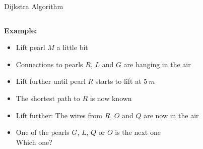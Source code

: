 
\begin{frame}{Dijkstra Algorithm}
  \vspace{-1.5em}
  \begin{columns}
    \begin{column}{0.55\linewidth}
      \textbf{Example:}
      \begin{itemize}
        \item
          Lift pearl {\color{Mittel-Blau}$M$} a little bit
        \item
          Connections to pearls {\color{Mittel-Blau}$R$},
          {\color{Mittel-Blau}$L$} and {\color{Mittel-Blau}$G$} are hanging in
          the air
        \item
          Lift further until pearl {\color{Mittel-Blau}$R$} starts to lift at
          $\SI{5}{m}$
        \item
          The shortest path to {\color{Mittel-Blau}$R$} is now known
        \item
          Lift further: The wires from {\color{Mittel-Blau}$R$},
          {\color{Mittel-Blau}$O$} and {\color{Mittel-Blau}$Q$} are now in the
          air
        \item
          One of the pearls {\color{Mittel-Blau}$G$}, {\color{Mittel-Blau}$L$},
          {\color{Mittel-Blau}$Q$} or {\color{Mittel-Blau}$O$} is the next one\\
          {\color{gray}Which one?}
      \end{itemize}
    \end{column}
\end{columns}
\end{frame}
